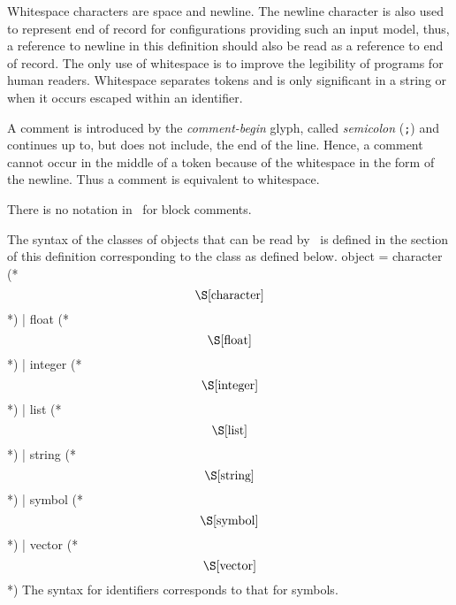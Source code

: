 %
\begin{optDefinition}
Whitespace characters are space and
newline.  The newline character is also used to represent end of record for
configurations providing such an input model, thus, a reference to newline in
this definition should also be read as a reference to end of record.  The only
use of whitespace is to improve the legibility of programs for human readers.
Whitespace separates tokens and is only significant in a string or when it
occurs escaped within an identifier.

A comment is introduced by the {\em
    comment-begin} glyph,
called {\em semicolon} (\verb+;+) and continues up to, but does not include, the
end of the line.  Hence, a comment cannot occur in the middle of a token because
of the whitespace in the form of the newline.  Thus a comment is equivalent to
whitespace.
%
\begin{note}
    There is no notation in \eulisp\ for block comments.
\end{note}
\end{optDefinition}
%
\begin{optDefinition}
The syntax of the classes of objects that can be read by \eulisp\ is defined in
the section of this definition corresponding to the class as defined below.
%
\Syntax
\label{object-syntax}
\savesyntax\objectSyntax\vbox{\small\syntax
object
    = character (* \[\S\ref{character}\] *)
    | float (* \[\S\ref{float}\] *)
    | integer (* \[\S\ref{integer}\] *)
    | list (* \[\S\ref{list}\] *)
    | string (* \[\S\ref{string}\] *)
    | symbol (* \[\S\ref{symbol}\] *)
    | vector (* \[\S\ref{vector}\] *)
\endsyntax}
%
The syntax for
identifiers
corresponds to that for symbols.
%
\end{optDefinition}
